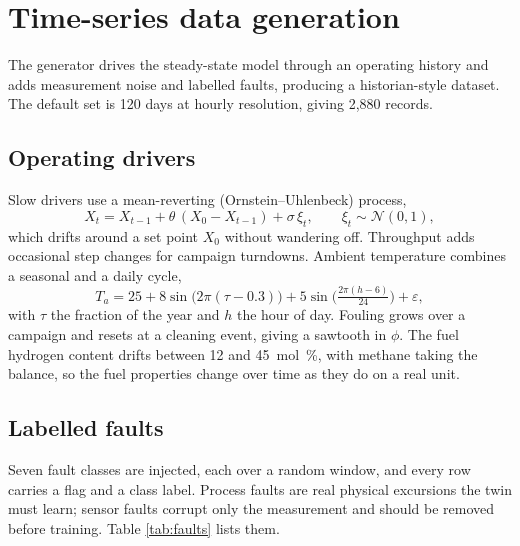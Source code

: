 \documentclass[11pt,a4paper]{article}
\begin{document}
\section{Time-series data generation}\label{sec:data}

The generator drives the steady-state model through an operating history and adds
measurement noise and labelled faults, producing a historian-style dataset. The
default set is 120 days at hourly resolution, giving 2{,}880 records.

\subsection{Operating drivers}
Slow drivers use a mean-reverting (Ornstein--Uhlenbeck) process,
\begin{equation}
X_{t} = X_{t-1} + \theta\,(X_0 - X_{t-1}) + \sigma\,\xi_t,\qquad \xi_t\sim\mathcal N(0,1),
\end{equation}
which drifts around a set point $X_0$ without wandering off. Throughput adds
occasional step changes for campaign turndowns. Ambient temperature combines a
seasonal and a daily cycle,
\begin{equation}
T_a = 25 + 8\sin\!\big(2\pi(\tau-0.3)\big) + 5\sin\!\Big(\tfrac{2\pi(h-6)}{24}\Big) + \varepsilon,
\end{equation}
with $\tau$ the fraction of the year and $h$ the hour of day. Fouling grows over a
campaign and resets at a cleaning event, giving a sawtooth in $\phi$. The fuel
hydrogen content drifts between \SI{12}{} and \SI{45}{mol\percent}, with methane
taking the balance, so the fuel properties change over time as they do on a real
unit.

\subsection{Labelled faults}
Seven fault classes are injected, each over a random window, and every row carries
a flag and a class label. Process faults are real physical excursions the twin
must learn; sensor faults corrupt only the measurement and should be removed
before training. Table \ref{tab:faults} lists them.
\end{document}
